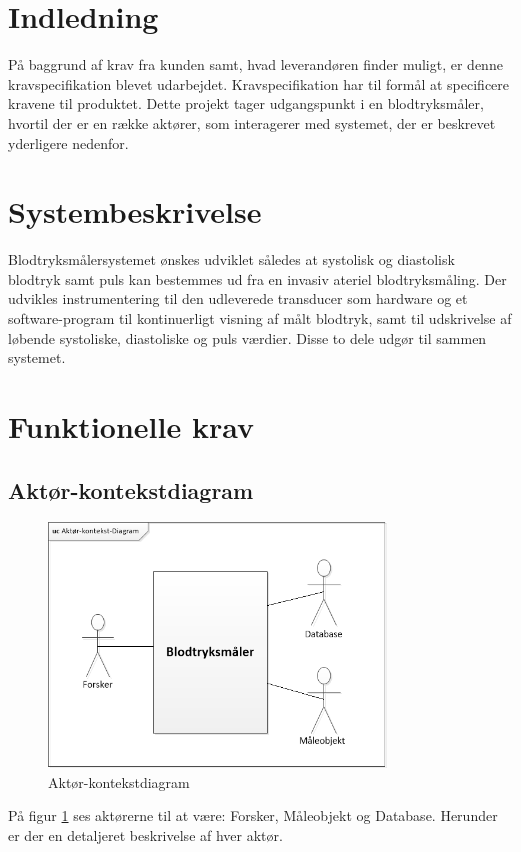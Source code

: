 \section{Indledning}
På baggrund af krav fra kunden samt, hvad leverandøren finder muligt, er denne kravspecifikation blevet udarbejdet. Kravspecifikation har til formål at specificere kravene til produktet. Dette projekt tager udgangspunkt i en blodtryksmåler, hvortil der er en række aktører, som interagerer med systemet, der er beskrevet yderligere nedenfor.

\section{Systembeskrivelse}
Blodtryksmålersystemet ønskes udviklet således at systolisk og diastolisk blodtryk samt puls kan bestemmes ud fra en invasiv ateriel blodtryksmåling. Der udvikles instrumentering til den udleverede transducer som hardware og et software-program til kontinuerligt visning af målt blodtryk, samt til udskrivelse af løbende systoliske, diastoliske og puls værdier. Disse to dele udgør til sammen systemet. 

\section{Funktionelle krav}
 

\subsection{Aktør-kontekstdiagram}


\begin{figure}[H]
	\centering
	\includegraphics[width=0.8\textwidth]{Figurer/Aktor-kontekst-diagram}
	\caption{Aktør-kontekstdiagram}
	\label{fig:aktoerbeskrivelse}
\end{figure}
På figur \ref{fig:aktoerbeskrivelse} ses aktørerne til at være: Forsker, Måleobjekt og Database. Herunder er der en detaljeret beskrivelse af hver aktør.


